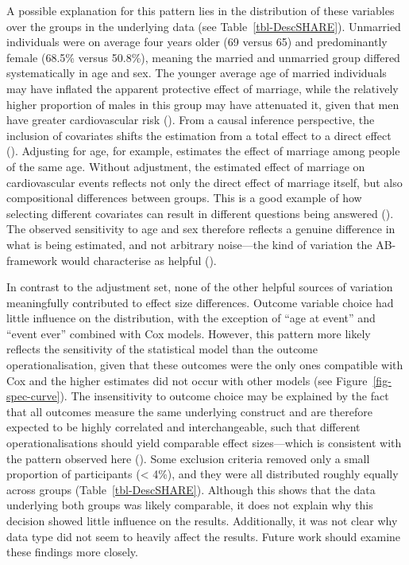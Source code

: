 \documentclass[
  man,
  floatsintext,
  longtable,
  nolmodern,
  notxfonts,
  notimes,
  colorlinks=true,linkcolor=blue,citecolor=blue,urlcolor=blue]{apa7}
\begin{document}
A possible explanation for this pattern lies in the distribution of
these variables over the groups in the underlying data (see
Table~\ref{tbl-DescSHARE}). Unmarried individuals were on average four
years older (69 versus 65) and predominantly female (68.5\% versus
50.8\%), meaning the married and unmarried group differed systematically
in age and sex. The younger average age of married individuals may have
inflated the apparent protective effect of marriage, while the
relatively higher proportion of males in this group may have attenuated
it, given that men have greater cardiovascular risk
(). From a
causal inference perspective, the inclusion of covariates shifts the
estimation from a total effect to a direct effect
(). Adjusting for age,
for example, estimates the effect of marriage among people of the same
age. Without adjustment, the estimated effect of marriage on
cardiovascular events reflects not only the direct effect of marriage
itself, but also compositional differences between groups. This is a
good example of how selecting different covariates can result in
different questions being answered
().
The observed sensitivity to age and sex therefore reflects a genuine
difference in what is being estimated, and not arbitrary noise---the
kind of variation the AB-framework would characterise as helpful
().

In contrast to the adjustment set, none of the other helpful sources of
variation meaningfully contributed to effect size differences. Outcome
variable choice had little influence on the distribution, with the
exception of ``age at event'' and ``event ever'' combined with Cox
models. However, this pattern more likely reflects the sensitivity of
the statistical model than the outcome operationalisation, given that
these outcomes were the only ones compatible with Cox and the higher
estimates did not occur with other models (see
Figure~\ref{fig-spec-curve}). The insensitivity to outcome choice may be
explained by the fact that all outcomes measure the same underlying
construct and are therefore expected to be highly correlated and
interchangeable, such that different operationalisations should yield
comparable effect sizes---which is consistent with the pattern observed
here (). Some
exclusion criteria removed only a small proportion of participants
(\textless{} 4\%), and they were all distributed roughly equally across
groups (Table~\ref{tbl-DescSHARE}). Although this shows that the data
underlying both groups was likely comparable, it does not explain why
this decision showed little influence on the results. Additionally, it
was not clear why data type did not seem to heavily affect the results.
Future work should examine these findings more closely.
\end{document}
